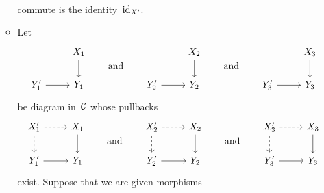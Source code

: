 \begin{remark*}
\begin{enumerate}
\begin{itemize}
\[\begin{tikzcd}[cramped]
            \end{tikzcd}
          \]
          commute is the identity~$\operatorname{id}_{X'}$.
        \item
          Let
          \[
            \begin{tikzcd}
                {}
              & X_1
                \arrow{d}
              \\
                Y'_1
                \arrow{r}
              & Y_1
            \end{tikzcd}
            \qquad\text{and}\qquad
            \begin{tikzcd}
                {}
              & X_2
                \arrow{d}
              \\
                Y'_2
                \arrow{r}
              & Y_2
            \end{tikzcd}
            \qquad\text{and}\qquad
            \begin{tikzcd}
                {}
              & X_3
                \arrow{d}
              \\
                Y'_3
                \arrow{r}
              & Y_3
            \end{tikzcd}
          \]
          be diagram in~$\mathcal{C}$ whose pullbacks
          \[
            \begin{tikzcd}
                X'_1
                \arrow[dashed]{r}
                \arrow[dashed]{d}
              & X_1
                \arrow{d}
              \\
                Y'_1
                \arrow{r}
              & Y_1
            \end{tikzcd}
            \qquad\text{and}\qquad
            \begin{tikzcd}
                X'_2
                \arrow[dashed]{r}
                \arrow[dashed]{d}
              & X_2
                \arrow{d}
              \\
                Y'_2
                \arrow{r}
              & Y_2
            \end{tikzcd}
            \qquad\text{and}\qquad
            \begin{tikzcd}
                X'_3
                \arrow[dashed]{r}
                \arrow[dashed]{d}
              & X_3
                \arrow{d}
              \\
                Y'_3
                \arrow{r}
              & Y_3
            \end{tikzcd}
          \]
          exist.
          Suppose that we are given morphisms

\end{itemize}
\end{enumerate}
\end{remark*}
